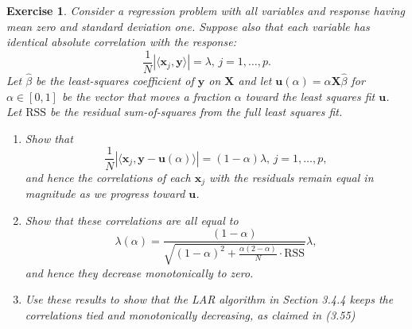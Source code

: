 \documentclass[12pt]{article}
\def\bx{\textbf{x}}
\def\bX{\textbf{X}}
\def\bu{\textbf{u}}
\def\by{\textbf{y}}
\def\RSS{\text{RSS}}
\newtheorem{exercise}{Exercise}[section]
\begin{document}
\begin{exercise}
Consider a regression problem with all variables and response having mean zero and standard deviation one. Suppose also that each variable has identical absolute correlation with the response:
$$\frac{1}{N}|\langle \bx_j, \by \rangle | = \lambda, \, j = 1, \dots, p.$$	
Let $\hat{\beta}$ be the least-squares coefficient of $\by$ on $\bX$ and let $\bu(\alpha) = \alpha \bX \hat{\beta}$ for $\alpha \in [0,1]$ be the vector that moves a fraction $\alpha$ toward the least squares fit $\bu$. Let $\RSS$ be the residual sum-of-squares from the full least squares fit.

\begin{enumerate}
\item[(a)] Show that
$$\frac{1}{N} |\langle \bx_j, \by - \bu(\alpha) \rangle| = (1-\alpha) \lambda, \, j = 1, \dots, p,$$
and hence the correlations of each $\bx_j$ with the residuals remain equal in magnitude as we progress toward $\bu$.

\item [(b)] Show that these correlations are all equal to
$$\lambda(\alpha) = \frac{(1-\alpha)}{\sqrt{(1-\alpha)^2 + \frac{\alpha(2-\alpha)}{N}\cdot \RSS}} \lambda,$$
and hence they decrease monotonically to zero.

\item[(c)] Use these results to show that the LAR algorithm in Section 3.4.4 keeps the correlations tied and monotonically decreasing, as claimed in (3.55)	
\end{enumerate}
\end{exercise}
\end{document}
